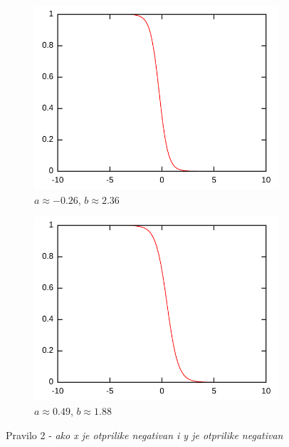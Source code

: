 \documentclass{article}
\begin{document}
\begin{figure}[h]
    \centering
    \begin{subfigure}[b]{0.49\textwidth}
        \centering
        \includegraphics[width=\textwidth]{img/rule-2-A.pdf}
        \caption{$ a \approx -0.26 $, $ b \approx 2.36 $}
    \end{subfigure}
    \hfill
    \begin{subfigure}[b]{0.49\textwidth}
        \centering
        \includegraphics[width=\textwidth]{img/rule-2-B.pdf}
        \caption{$ a \approx 0.49 $, $ b \approx 1.88 $}
    \end{subfigure}
    \hfill
    \caption{Pravilo 2 - \textit{ako x je otprilike negativan i y je otprilike negativan}}
    \label{rule-2}
\end{figure}
\end{document}
